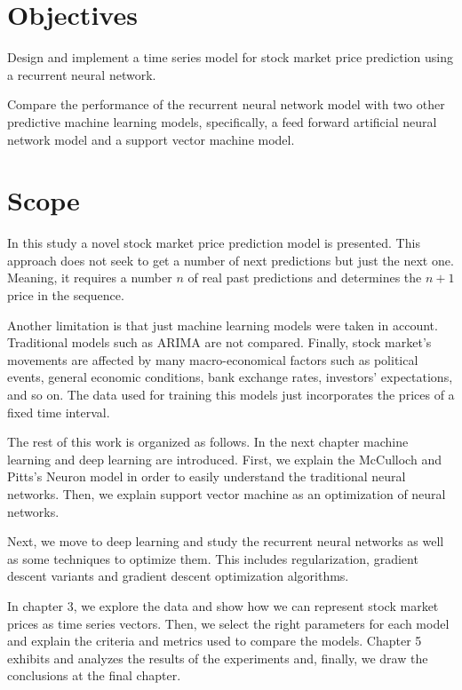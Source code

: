 \section{Objectives}
Design and implement a time series model for stock market price prediction using a recurrent neural network.

Compare the performance of the recurrent neural network model with two other predictive machine learning models, specifically, a feed forward artificial neural network model and a support vector machine model.

\section{Scope}
In this study a novel stock market price prediction model is presented. This approach does not seek to get a number of next predictions but just the next one. Meaning, it requires a number $n$ of real past predictions and determines the $n+1$ price in the sequence. 

Another limitation is that just machine learning models were taken in account. Traditional models such as ARIMA are not compared. Finally, stock market’s movements are affected by many macro-economical factors such as political events, general economic conditions, bank exchange rates, investors’ expectations, and so on. The data used for training this models just incorporates the prices of a fixed time interval.

The rest of this work is organized as follows. In the next chapter machine learning and deep learning are introduced. First, we explain the McCulloch and Pitts's Neuron model in order to easily understand the traditional neural networks. Then, we explain support vector machine as an optimization of neural networks.

Next, we move to deep learning and study the recurrent neural networks as well as some techniques to optimize them. This includes regularization, gradient descent variants and gradient descent optimization algorithms.  

In  chapter 3, we explore the data and show how we can represent stock market prices as time series vectors. Then, we select the right parameters for each model and explain the criteria and metrics used to compare the models. Chapter 5 exhibits and analyzes  the results of the experiments and, finally, we draw the conclusions at the final chapter.

